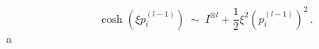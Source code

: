 \begin{equation}\cosh\left( \xi
p_i^{(l-1)}\right) \ \sim \ I^{\otimes l} + \frac{1}{2} \xi^2
\left( p_i^{(l-1)}\right)^2\, .\label{440}\end{equation}a
